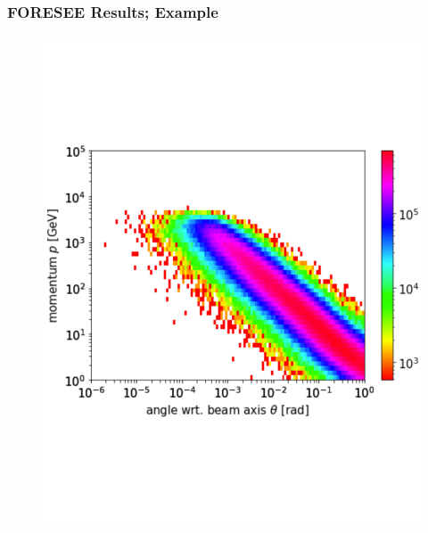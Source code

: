 \documentclass[
	11pt, %
]{beamer}
\begin{document}
\begin{frame}
\frametitle{FORESEE Results; Example}
\begin{figure}
	\vspace*{-1cm}
	 \hspace*{-0cm}
	\includegraphics[scale=.18]{Ds_spectra.pdf}

\end{figure}
\end{frame}
\end{document}
